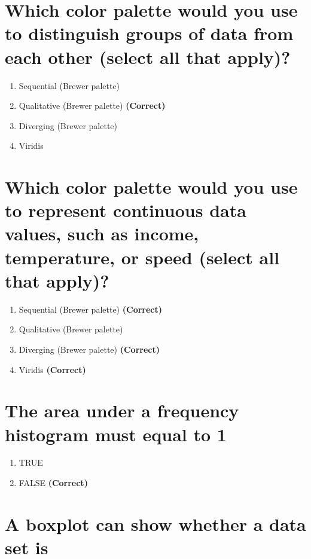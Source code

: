 \documentclass[letterpaper,10pt,twoside,printwatermark=false]{pinp}
\providecommand{\tightlist}{%
  \setlength{\itemsep}{0pt}\setlength{\parskip}{0pt}}
\begin{document}
\section{Which color palette would you use to distinguish groups of data
from each other (select all that
apply)?}\label{which-color-palette-would-you-use-to-distinguish-groups-of-data-from-each-other-select-all-that-apply}

\begin{enumerate}
\def\labelenumi{\arabic{enumi}.}
\tightlist
\item
  Sequential (Brewer palette)
\item
  Qualitative (Brewer palette) \textbf{(Correct)}
\item
  Diverging (Brewer palette)
\item
  Viridis
\end{enumerate}

\section{Which color palette would you use to represent continuous data
values, such as income, temperature, or speed (select all that
apply)?}\label{which-color-palette-would-you-use-to-represent-continuous-data-values-such-as-income-temperature-or-speed-select-all-that-apply}

\begin{enumerate}
\def\labelenumi{\arabic{enumi}.}
\tightlist
\item
  Sequential (Brewer palette) \textbf{(Correct)}
\item
  Qualitative (Brewer palette)
\item
  Diverging (Brewer palette) \textbf{(Correct)}
\item
  Viridis \textbf{(Correct)}
\end{enumerate}

\section{The area under a frequency histogram must equal to
1}\label{the-area-under-a-frequency-histogram-must-equal-to-1}

\begin{enumerate}
\def\labelenumi{\arabic{enumi}.}
\tightlist
\item
  TRUE
\item
  FALSE \textbf{(Correct)}
\end{enumerate}

\section{A boxplot can show whether a data set
is}\label{a-boxplot-can-show-whether-a-data-set-is}
\end{document}
